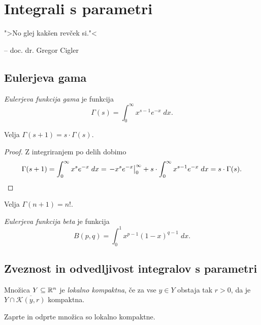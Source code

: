 \section{Integrali s parametri}

\epigraph{">No glej kakšen revček si."<}{-- doc. dr. Gregor Cigler}

\subsection{Eulerjeva gama}


\begin{definicija}
\emph{Eulerjeva funkcija gama} je funkcija
\[
\Gamma(s) = \int_0^\infty x^{s-1} e^{-x}\;dx.
\]
\end{definicija}

\begin{trditev}
Velja $\Gamma(s+1) = s \cdot \Gamma(s)$.
\end{trditev}

\begin{proof}
Z integriranjem po delih dobimo
\[
\Gamma(s+1) =
\int_0^\infty x^s e^{-x}\;dx =
\left. -x^s e^{-x}\right|_{0}^{\infty} +
s \cdot \int_0^\infty x^{s-1} e^{-x}\;dx =
s \cdot \Gamma(s). \qedhere
\]
\end{proof}

\begin{posledica}
Velja $\Gamma(n+1) = n!$.
\end{posledica}

\begin{definicija}
\emph{Eulerjeva funkcija beta} je funkcija
\[
B(p,q) = \int_0^1 x^{p-1}(1-x)^{q-1}\;dx.
\]
\end{definicija}

\newpage

\subsection{Zveznost in odvedljivost integralov s parametri}

\begin{definicija}
Množica $Y \subseteq \mathbb{R}^n$ je
\emph{lokalno kompaktna}, če za
vse $y \in Y$ obstaja tak $r>0$, da je
$Y \cap \overline{\mathcal{K}(y,r)}$ kompaktna.
\end{definicija}

\begin{opomba}
Zaprte in odprte množica so lokalno kompaktne.
\end{opomba}

